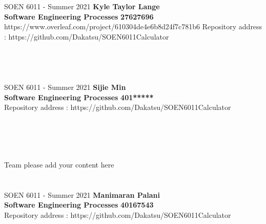 \documentclass[a4paper, 11pt]{report}
\begin{document}
\section*{}
\normalsize {SOEN 6011 - Summer 2021} \hfill \textbf{Kyle Taylor Lange} \\
\textbf{ Software Engineering Processes}  \hfill \textbf{27627696} \\https://www.overleaf.com/project/610304de4e6b8d24f7c781b6
\hfill Repository address : https://github.com/Dakatsu/SOEN6011Calculator
\\\\\\

\pagebreak

\section*{}
\normalsize {SOEN 6011 - Summer 2021} \hfill \textbf{Sijie Min} \\
\textbf{ Software Engineering Processes}  \hfill \textbf{401*****} \\
\hfill Repository address : https://github.com/Dakatsu/SOEN6011Calculator
\\\\\\\\\\
 \begin{center} Team please add your content here \end{center}
\pagebreak

\section*{}
\normalsize {SOEN 6011 - Summer 2021} \hfill \textbf{Manimaran Palani} \\
\textbf{ Software Engineering Processes}  \hfill \textbf{40167543} \\
\hfill Repository address : https://github.com/Dakatsu/SOEN6011Calculator
\\
\end{document}
